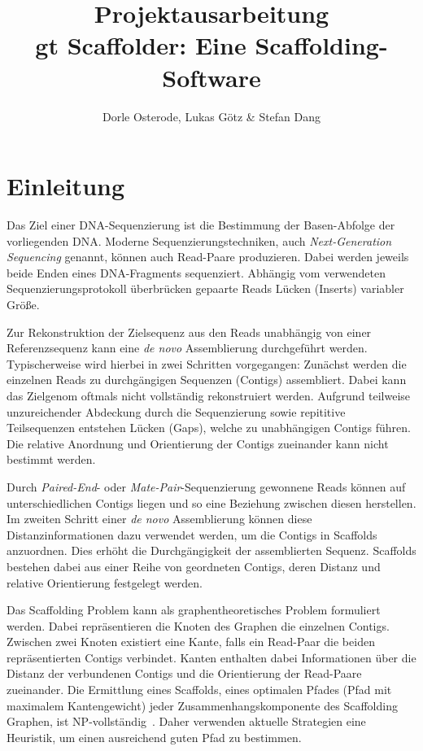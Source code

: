 \documentclass[a4paper,10pt,parskip]{scrartcl}
\title{Projektausarbeitung \\\vspace{.5cm} \large gt Scaffolder: Eine Scaffolding-Software}
\author{Dorle Osterode, Lukas Götz \& Stefan Dang}
\date{}
\begin{document}
\maketitle{}
\thispagestyle{empty}
\begin{abstract}
\end{abstract}

\newpage{}
\thispagestyle{empty}
\tableofcontents{}
\newpage{}
\setcounter{page}{1}
\section{Einleitung}

Das Ziel einer DNA-Sequenzierung ist die Bestimmung der Basen-Abfolge
der vorliegenden DNA. Moderne Sequenzierungstechniken, auch
\textit{Next-Generation Sequencing} genannt, können auch Read-Paare
produzieren. Dabei werden jeweils beide Enden eines DNA-Fragments
sequenziert. Abhängig vom verwendeten Sequenzierungsprotokoll
überbrücken gepaarte Reads Lücken (Inserts) variabler Größe.

Zur Rekonstruktion der Zielsequenz aus den Reads unabhängig von einer
Referenzsequenz kann eine \textit{de novo} Assemblierung durchgeführt
werden. Typischerweise wird hierbei in zwei Schritten vorgegangen:
Zunächst werden die einzelnen Reads zu durchgängigen Sequenzen
(Contigs) assembliert. Dabei kann das Zielgenom oftmals nicht
vollständig rekonstruiert werden. Aufgrund teilweise unzureichender
Abdeckung durch die Sequenzierung sowie repititive Teilsequenzen
entstehen Lücken (Gaps), welche zu unabhängigen Contigs führen. Die
relative Anordnung und Orientierung der Contigs zueinander kann nicht
bestimmt werden.

Durch \textit{Paired-End}- oder \textit{Mate-Pair}-Sequenzierung
gewonnene Reads können auf unterschiedlichen Contigs liegen und so
eine Beziehung zwischen diesen herstellen. Im zweiten Schritt einer
\textit{de novo} Assemblierung können diese Distanzinformationen dazu
verwendet werden, um die Contigs in Scaffolds anzuordnen. Dies erhöht
die Durchgängigkeit der assemblierten Sequenz. Scaffolds bestehen
dabei aus einer Reihe von geordneten Contigs, deren Distanz und
relative Orientierung festgelegt werden.

Das Scaffolding Problem kann als graphentheoretisches Problem
formuliert werden. Dabei repräsentieren die Knoten des Graphen die
einzelnen Contigs. Zwischen zwei Knoten existiert eine Kante, falls
ein Read-Paar die beiden repräsentierten Contigs verbindet. Kanten
enthalten dabei Informationen über die Distanz der verbundenen Contigs
und die Orientierung der Read-Paare zueinander. Die Ermittlung eines
Scaffolds, eines optimalen Pfades (Pfad mit maximalem Kantengewicht)
jeder Zusammenhangskomponente des Scaffolding Graphen, ist
NP-vollständig~\cite{Huson:2002kf}. Daher verwenden aktuelle
Strategien eine Heuristik, um einen ausreichend guten Pfad zu
bestimmen.
\end{document}
